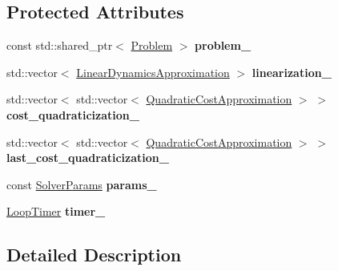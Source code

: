 \subsection*{Protected Attributes}
\begin{DoxyCompactItemize}
\item 
const std\+::shared\+\_\+ptr$<$ \hyperlink{classilqgames_1_1_problem}{Problem} $>$ {\bfseries problem\+\_\+}\hypertarget{classilqgames_1_1_game_solver_a3c1d8f6d4d9142d6bca23623391ca2c3}{}\label{classilqgames_1_1_game_solver_a3c1d8f6d4d9142d6bca23623391ca2c3}

\item 
std\+::vector$<$ \hyperlink{structilqgames_1_1_linear_dynamics_approximation}{Linear\+Dynamics\+Approximation} $>$ {\bfseries linearization\+\_\+}\hypertarget{classilqgames_1_1_game_solver_ad31cd30bf0b2fd95461672da928e91f2}{}\label{classilqgames_1_1_game_solver_ad31cd30bf0b2fd95461672da928e91f2}

\item 
std\+::vector$<$ std\+::vector$<$ \hyperlink{structilqgames_1_1_quadratic_cost_approximation}{Quadratic\+Cost\+Approximation} $>$ $>$ {\bfseries cost\+\_\+quadraticization\+\_\+}\hypertarget{classilqgames_1_1_game_solver_aa7a4c4edd7ecee0d856b928c5d27ded6}{}\label{classilqgames_1_1_game_solver_aa7a4c4edd7ecee0d856b928c5d27ded6}

\item 
std\+::vector$<$ std\+::vector$<$ \hyperlink{structilqgames_1_1_quadratic_cost_approximation}{Quadratic\+Cost\+Approximation} $>$ $>$ {\bfseries last\+\_\+cost\+\_\+quadraticization\+\_\+}\hypertarget{classilqgames_1_1_game_solver_a463e0e69bd055f4fa78841be22782ea8}{}\label{classilqgames_1_1_game_solver_a463e0e69bd055f4fa78841be22782ea8}

\item 
const \hyperlink{structilqgames_1_1_solver_params}{Solver\+Params} {\bfseries params\+\_\+}\hypertarget{classilqgames_1_1_game_solver_adb70fc48a6420c1b516becd5c108a92a}{}\label{classilqgames_1_1_game_solver_adb70fc48a6420c1b516becd5c108a92a}

\item 
\hyperlink{classilqgames_1_1_loop_timer}{Loop\+Timer} {\bfseries timer\+\_\+}\hypertarget{classilqgames_1_1_game_solver_ae77a0725fdd98ec49f96ebf33d966650}{}\label{classilqgames_1_1_game_solver_ae77a0725fdd98ec49f96ebf33d966650}

\end{DoxyCompactItemize}


\subsection{Detailed Description}


